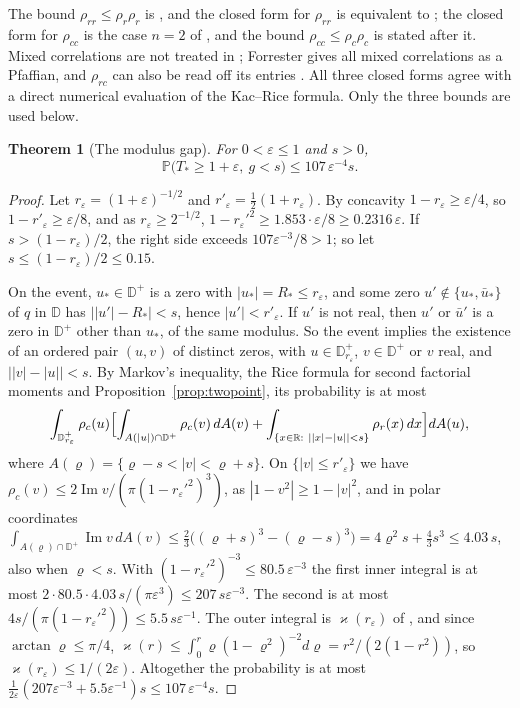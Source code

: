 \documentclass[11pt]{amsart}
\newtheorem{theorem}{Theorem}[section]
\theoremstyle{definition}
\theoremstyle{remark}
\numberwithin{equation}{section}
\newcommand{\R}{\mathbb{R}}
\newcommand{\D}{\mathbb{D}}
\newcommand{\PP}{\mathbb{P}}
\newcommand{\eps}{\varepsilon}
\DeclareMathOperator{\im}{Im}
\begin{document}
The bound $\rho_{rr}\le\rho_r\rho_r$ is \cite[Corollary~2.2]{MS}, and the closed form for $\rho_{rr}$ is equivalent to \cite[(2.6)]{MS}; the closed form for $\rho_{cc}$ is the case $n=2$ of \cite[Theorem~2.7]{MS}, and the bound $\rho_{cc}\le\rho_c\rho_c$ is stated after it. Mixed correlations are not treated in \cite{MS}; Forrester \cite[(30)]{Fo} gives all mixed correlations as a Pfaffian, and $\rho_{rc}$ can also be read off its entries \cite[(49)--(52)]{Fo}. All three closed forms agree with a direct numerical evaluation of the Kac--Rice formula. Only the three bounds are used below.

\begin{theorem}[The modulus gap]\label{thm:gap}
For $0<\eps\le1$ and $s>0$,
\[
\PP\bigl(T_*\ge1+\eps,\ g<s\bigr)\le107\,\eps^{-4}s .
\]
\end{theorem}

\begin{proof}
Let $r_\eps=(1+\eps)^{-1/2}$ and $r'_\eps=\frac12(1+r_\eps)$. By concavity $1-r_\eps\ge\eps/4$, so $1-r'_\eps\ge\eps/8$, and as $r_\eps\ge2^{-1/2}$, $1-r_\eps'^2\ge1.853\cdot\eps/8\ge0.2316\,\eps$. If $s>(1-r_\eps)/2$, the right side exceeds $107\eps^{-3}/8>1$; so let $s\le(1-r_\eps)/2\le0.15$.

On the event, $u_*\in\D^+$ is a zero with $|u_*|=R_*\le r_\eps$, and some zero $u'\notin\{u_*,\bar u_*\}$ of $q$ in $\D$ has $\bigl||u'|-R_*\bigr|<s$, hence $|u'|<r'_\eps$. If $u'$ is not real, then $u'$ or $\bar u'$ is a zero in $\D^+$ other than $u_*$, of the same modulus. So the event implies the existence of an ordered pair $(u,v)$ of distinct zeros, with $u\in\D^+_{r_\eps}$, $v\in\D^+$ or $v$ real, and $\bigl||v|-|u|\bigr|<s$. By Markov's inequality, the Rice formula for second factorial moments and Proposition~\ref{prop:twopoint}, its probability is at most
\[
\int_{\D^+_{r_\eps}}\rho_c(u)\Bigl[\int_{A(|u|)\cap\D^+}\rho_c(v)\,dA(v)+\int_{\{x\in\R:\ ||x|-|u||<s\}}\rho_r(x)\,dx\Bigr]dA(u),
\]
where $A(\varrho)=\{\varrho-s<|v|<\varrho+s\}$.
On $\{|v|\le r'_\eps\}$ we have $\rho_c(v)\le2\im v/(\pi(1-r_\eps'^2)^3)$, as $|1-v^2|\ge1-|v|^2$, and in polar coordinates $\int_{A(\varrho)\cap\D^+}\im v\,dA(v)\le\frac23\bigl((\varrho+s)^3-(\varrho-s)^3\bigr)=4\varrho^2s+\frac43s^3\le4.03\,s$, also when $\varrho<s$. With $(1-r_\eps'^2)^{-3}\le80.5\,\eps^{-3}$ the first inner integral is at most $2\cdot80.5\cdot4.03\,s/(\pi\eps^3)\le207\,s\eps^{-3}$. The second is at most $4s/(\pi(1-r_\eps'^2))\le5.5\,s\eps^{-1}$. The outer integral is $\varkappa(r_\eps)$ of \cite[Lemma~\ref{M-lem:pairs}]{Main}, and since $\arctan\varrho\le\pi/4$, $\varkappa(r)\le\int_0^r\varrho(1-\varrho^2)^{-2}d\varrho=r^2/(2(1-r^2))$, so $\varkappa(r_\eps)\le1/(2\eps)$. Altogether the probability is at most $\frac1{2\eps}(207\eps^{-3}+5.5\eps^{-1})s\le107\,\eps^{-4}s$.
\end{proof}
\end{document}
